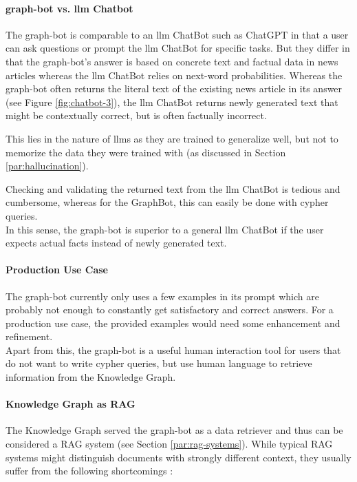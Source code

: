\paragraph{\gls{graph-bot} vs. \gls{llm} Chatbot}
The \gls{graph-bot} is comparable to an \gls{llm} ChatBot such as ChatGPT in that a user can ask questions or \gls{prompt} the \gls{llm} ChatBot for specific tasks.
But they differ in that the \gls{graph-bot}'s answer is based on concrete text and factual data in news articles whereas the \gls{llm} ChatBot relies
on next-word probabilities.
Whereas the \gls{graph-bot} often returns the literal text of the existing news article in its answer (see Figure \ref{fig:chatbot-3}),
the \gls{llm} ChatBot returns newly generated text that might be contextually correct, but is often factually incorrect.

This lies in the nature of \gls{llm}s as they are trained to generalize well, but not to memorize the data they were trained with (as discussed in Section \ref{par:hallucination}).

Checking and validating the returned text from the \gls{llm} ChatBot is tedious and cumbersome,
whereas for the GraphBot, this can easily be done with \gls{cypher} queries.\\
In this sense, the \gls{graph-bot} is superior to a general \gls{llm} ChatBot if the user expects actual facts instead of newly generated text.


\paragraph{Production Use Case}
The \gls{graph-bot} currently only uses a few examples in its \gls{prompt} which are probably not enough to constantly get satisfactory
and correct answers.
For a production use case, the provided examples would need some enhancement and refinement.\\
Apart from this, the \gls{graph-bot} is a useful human interaction tool for users that do not want to write \gls{cypher} queries,
but use human language to retrieve information from the Knowledge Graph.


\paragraph{Knowledge Graph as RAG}
The Knowledge Graph served the \gls{graph-bot} as a data retriever and thus can be considered a \gls{RAG} system (see Section \ref{par:rag-systems}).
While typical RAG systems might distinguish documents with strongly different context, they usually suffer from the following shortcomings \cite{rag-cririque}:

